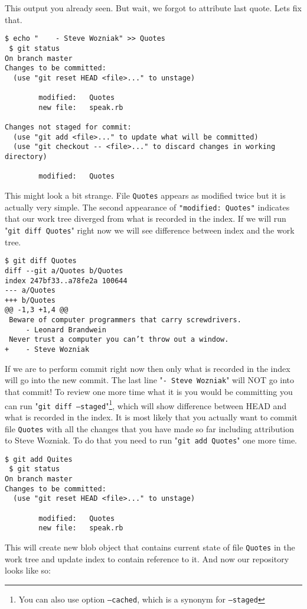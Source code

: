 \documentclass{article}
\theoremstyle{definition}
\begin{document}
        \noindent This output you already seen. But wait, we forgot to attribute last quote. Lets fix that.

    \begin{Verbatim}[frame=single]
 $ echo "    - Steve Wozniak" >> Quotes
 $ git status
On branch master
Changes to be committed:
  (use "git reset HEAD <file>..." to unstage)

        modified:   Quotes
        new file:   speak.rb

Changes not staged for commit:
  (use "git add <file>..." to update what will be committed)
  (use "git checkout -- <file>..." to discard changes in working directory)

        modified:   Quotes
        \end{Verbatim}
        This might look a bit strange. File \texttt{Quotes} appears as modified twice but it is actually very simple. The
        second appearance of \texttt{"modified: Quotes"} indicates that our work tree diverged from what is recorded in
        the index. If we will run "\texttt{git diff Quotes}" right now we will see difference between index and the work tree.

    \begin{Verbatim}[frame=single]
 $ git diff Quotes
diff --git a/Quotes b/Quotes
index 247bf33..a78fe2a 100644
--- a/Quotes
+++ b/Quotes
@@ -1,3 +1,4 @@
 Beware of computer programmers that carry screwdrivers.
     - Leonard Brandwein
 Never trust a computer you can’t throw out a window.
+    - Steve Wozniak
        \end{Verbatim}
        If we are to perform commit right now then only what is recorded in the index will go into the new commit. The
        last line "\texttt{- Steve Wozniak}" will NOT go into that commit! To review one more time what it is you would
        be committing you can run "\texttt{git diff --staged}"\footnote{You can also use option \texttt{--cached},
          which is a synonym for \texttt{--staged}}, which will show difference between HEAD and what is recorded in
        the index. It is most likely that you actually want to commit file \texttt{Quotes} with all the changes that
        you have made so far including attribution to Steve Wozniak. To do that you need to run
        "\texttt{git add Quotes}" one more time.

    \begin{Verbatim}[frame=single]
 $ git add Quites
 $ git status
On branch master
Changes to be committed:
  (use "git reset HEAD <file>..." to unstage)

        modified:   Quotes
        new file:   speak.rb
        \end{Verbatim}
        This will create new blob object that contains current state of file \texttt{Quotes} in the work tree and
        update index to contain reference to it. And now our repository looks like so:
\end{document}
